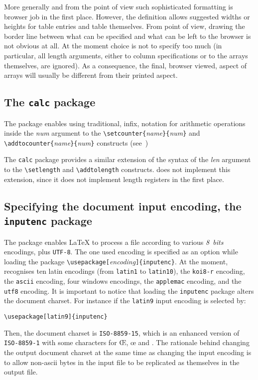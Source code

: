 More generally and from the \html{} point of view such sophisticated
formatting is browser job in the first place.
However, the \html{} definition allows suggested widths or heights for
table entries and table themselves.
From \hevea{} point of view, drawing the border line between what can be
specified and what can be left to the browser is not obvious at all.
At the moment \hevea{} choice is not to specify too much (in
particular, all length
arguments, either to column specifications or to the arrays
themselves, are ignored). As a consequence, the final, browser viewed,
aspect of arrays will usually be different from their printed
aspect.

\subsection{The \texttt{calc}\label{calc} package}
%
The 
package enables using traditional, infix, notation for
arithmetic operations
inside the \textit{num} argument to the
\verb+\setcounter{+\textit{name}\verb+}{+\textit{num}\verb+}+
and \verb+\addtocounter{+\textit{name}\verb+}{+\textit{num}\verb+}+
constructs (see~\cite[Section~A.4]{latexbis})

The \texttt{calc} package provides a similar extension of the syntax
of the \textit{len} argument to the \verb+\setlength+ and
\verb+\addtolength+ constructs.
\hevea{} does not implement this extension, since it does not
implement length registers in the first place.

\subsection{Specifying \label{inputenc}the document input encoding, the \texttt{inputenc} package}
%
The 
package enables \LaTeX{} to process a file
according to various \emph{8~bits} encodings, plus \texttt{UTF-8}.
The one used encoding is specified as an option while loading the package
\verb+\usepackage[+\textit{encoding}\verb+]{inputenc}+.
At the moment, \hevea{} recognises ten latin encodings
(from \texttt{latin1} to \texttt{latin10}),
the \texttt{koi8-r} encoding,
the \texttt{ascii} encoding,
four windows encodings, the \texttt{applemac} encoding, and the
\texttt{utf8} encoding.
It is important to notice that loading the \verb+inputenc+ package
alters the \html{} document charset.
For instance if the \texttt{latin9} input encoding is selected by:
\begin{verbatim}
\usepackage[latin9]{inputenc}
\end{verbatim}
Then, the document charset is \verb+ISO-8859-15+, which is an
enhanced version of \verb+ISO-8859-1+ with some characters
for \OE, \oe{} and \texteuro.
The rationale behind changing the output document charset at the same
time as changing the input encoding is to allow
non-ascii bytes in the input file to be replicated as
themselves in the output file.

